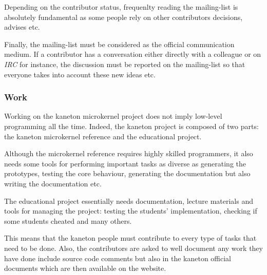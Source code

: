 Depending on the contributor status, frequenlty reading the mailing-list is
absolutely fundamental as some people rely on other contributors decisions,
advises etc.

Finally, the mailing-list must be considered as the official communication
medium. If a contributor has a conversation either directly with a colleague
or on \textit{IRC} for instance, the discussion must be reported on the
mailing-list so that everyone takes into account these new ideas etc.


\subsubsection{Work}

Working on the kaneton microkernel project does not imply low-level programming
all the time. Indeed, the kaneton project is composed of two parts: the
kaneton microkernel reference and the educational project.

Although the microkernel reference requires highly skilled programmers,
it also needs some tools for performing important tasks as diverse as
generating the prototypes, testing the core behaviour, generating the
documentation but also writing the documentation etc.

The educational project essentially needs documentation, lecture materials
and tools for managing the project: testing the students' implementation,
checking if some students cheated and many others.

This means that the kaneton people must contribute to every type of tasks
that need to be done. Also, the contributors are asked to well document
any work they have done include source code comments but also in the
kaneton official documents which are then available on the website.
